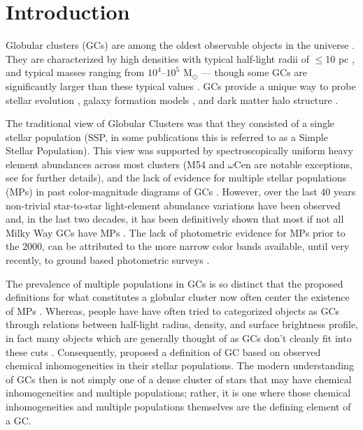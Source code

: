 \section{Introduction}\label{sec:Intro}
Globular clusters (GCs) are among the oldest observable objects in the universe
\citep{Pen11}. They are characterized by high densities with typical half-light
radii of $\le$10 pc \citep{Vanderburg2010}, and typical masses ranging from
$10^{4}$--$10^{5}$ M$_{\odot}$ \citep{Bro06} --- though some GCs are
significantly larger than these typical values \citep[e.g. $\omega$ Cen,
][]{Richer1991}. GCs provide a unique way to probe stellar evolution
\citep{Bau03}, galaxy formation models \citep{Boy18,Kra05}, and dark matter
halo structure \citep{Hud18}.

The traditional view of Globular Clusters was that they consisted of a single
stellar population (SSP, in some publications this is referred to as a Simple
Stellar Population). This view was supported by spectroscopically uniform heavy
element abundances \citep{Carretta2010, Bastian2018} across most clusters (M54
and $\omega$Cen are notable exceptions, see \citet{Marino2015} for further
details), and the lack of evidence for multiple stellar populations (MPs) in
past color-magnitude diagrams of GCs \citep[i.e.][]{Sandage1953, Alcaino1975}.
However, over the last 40 years non-trivial star-to-star light-element
abundance variations have been observed \citep[i.e.][]{Smith1987} and, in the
last two decades, it has been definitively shown that most if not all Milky Way
GCs have MPs \citep{Gratton2004, Gratton2012, Piotto2015}. The lack of
photometric evidence for MPs prior to the 2000, can be attributed to the more
narrow color bands available, until very recently, to ground based photometric
surveys \citep{Milone2017}.

The prevalence of multiple populations in GCs is so distinct that the proposed
definitions for what constitutes a globular cluster now often center the
existence of MPs \citep[e.g.][]{Carretta2010}. Whereas, people have have often tried to categorized objects
as GCs through relations between half-light radius, density, and surface
brightness profile, in fact many objects which are generally thought of as GCs
don't cleanly fit into these cuts \citep{Peebles1968, Brown1991, Brown1995, Bekki2002}.
Consequently, \citet{Carretta2010} proposed a definition of GC based on
observed chemical inhomogeneities in their stellar populations. The modern
understanding of GCs then is not simply one of a dense cluster of stars that
may have chemical inhomogeneities and multiple populations; rather, it is one
where those chemical inhomogeneities and multiple populations themselves are
the defining element of a GC.

